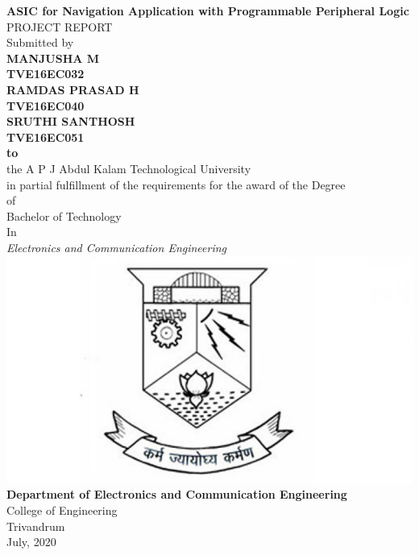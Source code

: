 \documentclass[12pt,a4paper]{report}
\begin{document}
\pagestyle{empty}
\begin{center}
{\Large \textbf{ASIC for Navigation Application with Programmable Peripheral Logic}}\\
\vspace{0.2cm}
PROJECT REPORT\\
\vspace{0.2cm}
Submitted by \\
\vspace{0.2cm}
\textbf{MANJUSHA M}\\
\textbf{TVE16EC032}\\
\vspace{0.12cm}
\textbf{RAMDAS PRASAD H}\\
\textbf{TVE16EC040}\\
\vspace{0.12cm}
\textbf{SRUTHI SANTHOSH}\\
\textbf{TVE16EC051}\\
\vspace{0.12cm}
\textbf{to}\\
\vspace{0.12cm}
the A P J Abdul Kalam Technological University \\
in partial fulfillment of the requirements for the award of the Degree \\
of\\
Bachelor of Technology \\
In\\
\textit{Electronics and Communication Engineering}\\
\includegraphics[scale=0.4]{CET_logo.jpeg}\\
\textbf{Department of Electronics and Communication Engineering}\\
College of Engineering\\
Trivandrum\\
July, 2020
\end{center}
\end{document}
